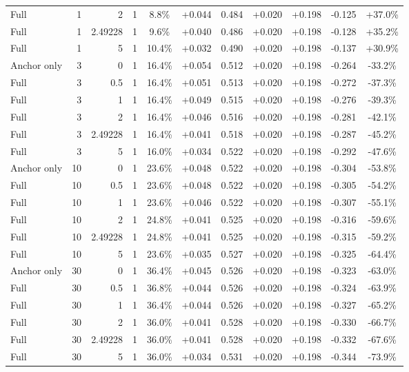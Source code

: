\begin{table}[htbp]
\begin{tabular}{lrrrccccccc}
Full & 1 & 2 & 1 & 8.8\% & +0.044 & 0.484 & +0.020 & +0.198 & -0.125 & +37.0\% \\
Full & 1 & 2.49228 & 1 & 9.6\% & +0.040 & 0.486 & +0.020 & +0.198 & -0.128 & +35.2\% \\
Full & 1 & 5 & 1 & 10.4\% & +0.032 & 0.490 & +0.020 & +0.198 & -0.137 & +30.9\% \\
Anchor only & 3 & 0 & 1 & 16.4\% & +0.054 & 0.512 & +0.020 & +0.198 & -0.264 & -33.2\% \\
Full & 3 & 0.5 & 1 & 16.4\% & +0.051 & 0.513 & +0.020 & +0.198 & -0.272 & -37.3\% \\
Full & 3 & 1 & 1 & 16.4\% & +0.049 & 0.515 & +0.020 & +0.198 & -0.276 & -39.3\% \\
Full & 3 & 2 & 1 & 16.4\% & +0.046 & 0.516 & +0.020 & +0.198 & -0.281 & -42.1\% \\
Full & 3 & 2.49228 & 1 & 16.4\% & +0.041 & 0.518 & +0.020 & +0.198 & -0.287 & -45.2\% \\
Full & 3 & 5 & 1 & 16.0\% & +0.034 & 0.522 & +0.020 & +0.198 & -0.292 & -47.6\% \\
Anchor only & 10 & 0 & 1 & 23.6\% & +0.048 & 0.522 & +0.020 & +0.198 & -0.304 & -53.8\% \\
Full & 10 & 0.5 & 1 & 23.6\% & +0.048 & 0.522 & +0.020 & +0.198 & -0.305 & -54.2\% \\
Full & 10 & 1 & 1 & 23.6\% & +0.046 & 0.522 & +0.020 & +0.198 & -0.307 & -55.1\% \\
Full & 10 & 2 & 1 & 24.8\% & +0.041 & 0.525 & +0.020 & +0.198 & -0.316 & -59.6\% \\
Full & 10 & 2.49228 & 1 & 24.8\% & +0.041 & 0.525 & +0.020 & +0.198 & -0.315 & -59.2\% \\
Full & 10 & 5 & 1 & 23.6\% & +0.035 & 0.527 & +0.020 & +0.198 & -0.325 & -64.4\% \\
Anchor only & 30 & 0 & 1 & 36.4\% & +0.045 & 0.526 & +0.020 & +0.198 & -0.323 & -63.0\% \\
Full & 30 & 0.5 & 1 & 36.8\% & +0.044 & 0.526 & +0.020 & +0.198 & -0.324 & -63.9\% \\
Full & 30 & 1 & 1 & 36.4\% & +0.044 & 0.526 & +0.020 & +0.198 & -0.327 & -65.2\% \\
Full & 30 & 2 & 1 & 36.0\% & +0.041 & 0.528 & +0.020 & +0.198 & -0.330 & -66.7\% \\
Full & 30 & 2.49228 & 1 & 36.0\% & +0.041 & 0.528 & +0.020 & +0.198 & -0.332 & -67.6\% \\
Full & 30 & 5 & 1 & 36.0\% & +0.034 & 0.531 & +0.020 & +0.198 & -0.344 & -73.9\% \\

\end{tabular}
\end{table}
